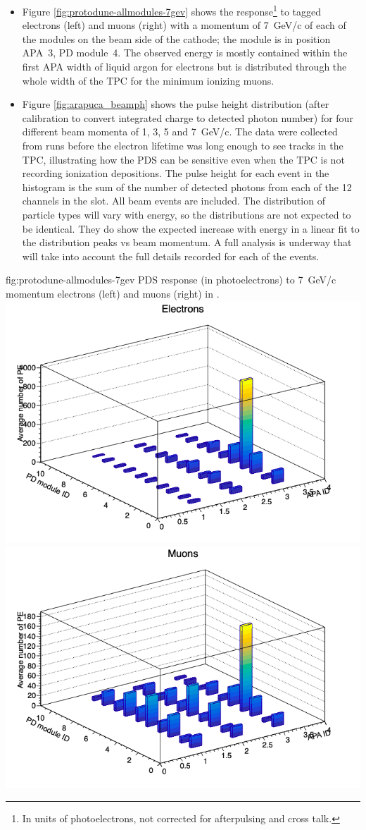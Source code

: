 \begin{itemize}
   \item Figure \ref{fig:protodune-allmodules-7gev} shows the response\footnote{In units of photoelectrons, not corrected for afterpulsing and cross talk.} to tagged electrons (left) and muons (right) with a momentum of \SI{7}{GeV/c} of each of the  modules on the beam side of the cathode; the  module is in position APA~3, PD module~4. The observed energy is mostly contained within the first APA width of liquid argon for electrons but is distributed through the whole width of the TPC for the minimum ionizing muons.

   \item Figure \ref{fig:arapuca_beamph} shows the pulse height distribution (after calibration to convert integrated charge to detected photon number) for four different beam momenta of \num{1}, \num{3}, \num{5} and \SI{7}{GeV/c}. The data were collected from runs before the electron lifetime was long enough to see tracks in the TPC, illustrating how the PDS can be sensitive even when the TPC is not recording ionization depositions.  The pulse height for each event in the histogram is the sum of the number of detected photons from each of the \num{12}  channels in the slot.  All beam events are included. The distribution of particle types will vary with energy, so the distributions are not expected to be identical.  They do show the expected increase with energy in a linear fit to the distribution peaks vs beam momentum.  A full analysis is underway that will take into account the full details recorded for each of the events.  
\end{itemize}

\begin{dunefigure}{fig:protodune-allmodules-7gev}
{PDS response (in photoelectrons) to \SI{7}{GeV/c} momentum electrons (left) and muons (right) in .}
\includegraphics[angle=0,width=0.45\columnwidth]{graphics/pds-electrons-pd-modules.png}
\includegraphics[angle=0,width=0.45\columnwidth]{graphics/pds-muons-pd-modules.png}
\end{dunefigure}

